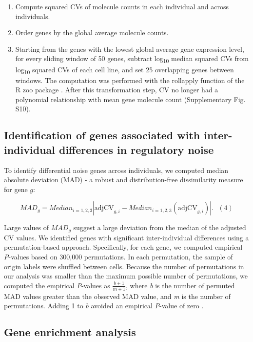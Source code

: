 \begin{enumerate}
\def\labelenumi{\arabic{enumi}.}
\item
  Compute squared CVs of molecule counts in each individual and across
  individuals.
\item
  Order genes by the global average molecule counts.
\item
  Starting from the genes with the lowest global average gene expression
  level, for every sliding window of 50 genes, subtract
  log\textsubscript{10} median squared CVs from log\textsubscript{10}
  squared CVs of each cell line, and set 25 overlapping genes between
  windows. The computation was performed with the rollapply function of
  the R zoo package \citep{Zeileis2005}. After this transformation step,
  CV no longer had a polynomial relationship with mean gene molecule
  count (Supplementary Fig. S10).
\end{enumerate}

\subsection{Identification of genes associated with inter-individual
differences in regulatory
noise}\label{identification-of-genes-associated-with-inter-individual-differences-in-regulatory-noise}

To identify differential noise genes across individuals, we computed
median absolute deviation (MAD) - a robust and distribution-free
dissimilarity measure for gene $g$:

\[ MAD_{g} = Median_{i= 1,2,3} \left| \text{adjCV}_{g,i} -  Median_{i= 1,2,3} ({\text{adjCV}}_{g,i}) \right|. \,\,\,\,(4)\]

Large values of $MAD_{g}$ suggest a large deviation from the median of
the adjusted CV values. We identified genes with significant
inter-individual differences using a permutation-based approach.
Specifically, for each gene, we computed empirical \emph{P}-values based
on 300,000 permutations. In each permutation, the sample of origin
labels were shuffled between cells. Because the number of permutations
in our analysis was smaller than the maximum possible number of
permutations, we computed the empirical \emph{P}-values as
$\frac{b + 1}{m + 1}$, where \emph{b} is the number of permuted MAD
values greater than the observed MAD value, and \emph{m} is the number
of permutations. Adding 1 to \emph{b} avoided an empirical
\emph{P}-value of zero \citep{Phipson2010}.

\subsection{Gene enrichment analysis}\label{gene-enrichment-analysis}

